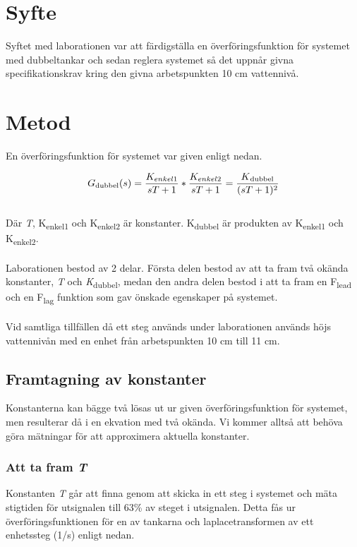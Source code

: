 \documentclass{article}
\begin{document}


\section{Syfte}
Syftet med laborationen var att färdigställa en överföringsfunktion för systemet med dubbeltankar och sedan reglera systemet så det uppnår givna specifikationskrav kring den givna arbetspunkten 10 cm vattennivå. 




\section{Metod}

En överföringsfunktion för systemet var given enligt nedan. 

\begin{equation}
G\textsubscript{dubbel}(s) = \frac{K_{enkel1}}{sT+1} * \frac{K_{enkel2}}{sT+1} = \frac{K\textsubscript{dubbel}}{(sT+1)^2}
\end{equation}
\\
Där {\itshape T}, K\textsubscript{enkel1} och K\textsubscript{enkel2} är konstanter. K\textsubscript{dubbel} är produkten av K\textsubscript{enkel1} och K\textsubscript{enkel2}. 
\\
\\
Laborationen bestod av 2 delar. Första delen bestod av att ta fram två okända konstanter, {\itshape T} och {\itshape K}\textsubscript{dubbel}, medan den andra delen bestod i att ta fram en F\textsubscript{lead} och en F\textsubscript{lag} funktion som gav önskade egenskaper på systemet. 
\\
\\
Vid samtliga tillfällen då ett steg används under laborationen används höjs vattennivån med en enhet från arbetspunkten 10 cm till 11 cm.


\subsection{Framtagning av konstanter}
Konstanterna kan bägge två lösas ut ur given överföringsfunktion för systemet, men resulterar då i en ekvation med två okända. Vi kommer alltså att behöva göra mätningar för att approximera aktuella konstanter. 



\subsubsection{Att ta fram {\itshape T}}
Konstanten {\itshape T} går att finna genom att skicka in ett steg i systemet och mäta stigtiden för utsignalen till 63\% av steget i utsignalen. Detta fås ur överföringsfunktionen för en av tankarna och laplacetransformen av ett enhetssteg (1/s) enligt nedan. 
\end{document}
